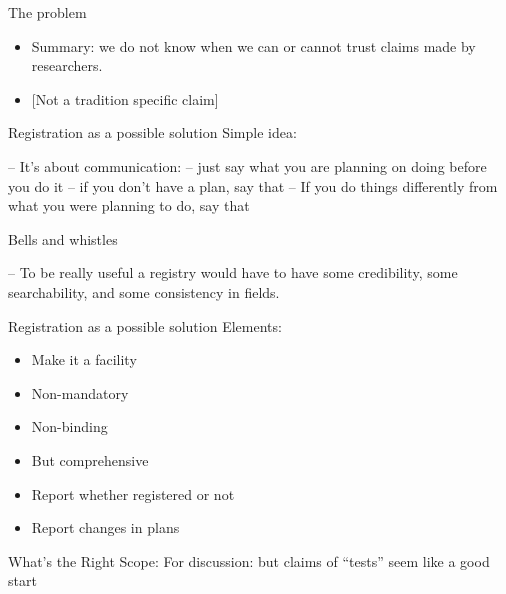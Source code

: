 \documentclass[
  11pt,
  ignorenonframetext,
]{beamer}
\begin{document}
\begin{frame}{The problem}
\protect\hypertarget{the-problem}{}
\begin{itemize}
\item
  Summary: we do not know when we can or cannot trust claims made by
  researchers.
\item
  {[}Not a tradition specific claim{]}
\end{itemize}
\end{frame}

\begin{frame}{Registration as a possible solution}
\protect\hypertarget{registration-as-a-possible-solution}{}
Simple idea:

-- It's about communication: -- just say what you are planning on doing
before you do it -- if you don't have a plan, say that -- If you do
things differently from what you were planning to do, say that

Bells and whistles

-- To be really useful a registry would have to have some credibility,
some searchability, and some consistency in fields.
\end{frame}

\begin{frame}{Registration as a possible solution}
\protect\hypertarget{registration-as-a-possible-solution-1}{}
Elements:

\begin{itemize}
\item
  Make it a facility
\item
  Non-mandatory
\item
  Non-binding
\item
  But comprehensive
\item
  Report whether registered or not
\item
  Report changes in plans
\end{itemize}
\end{frame}

\begin{frame}{What's the Right Scope:}
\protect\hypertarget{whats-the-right-scope}{}
For discussion: but claims of ``tests'' seem like a good start
\end{frame}
\end{document}
